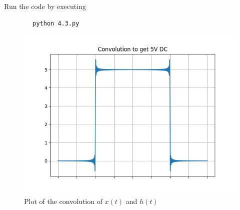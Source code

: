 \documentclass[journal,12pt,twocolumn]{IEEEtran}
\numberwithin{equation}{section}
\numberwithin{figure}{section}
\renewcommand\thesection{\arabic{section}}
\begin{document}
\begin{enumerate}[label=\thesection.\arabic*,ref=\thesection.\theenumi]
	Run the code by executing
	\begin{lstlisting}
		python 4.3.py
	\end{lstlisting}

	\begin{figure}[!ht]
		\centering
		\includegraphics[width=\columnwidth]{./figs/4.3.png}
		\caption{Plot of the convolution of $x(t)$ and $h(t)$}
		\label{fig-4.3}	
	\end{figure}
	\end{enumerate}
	
\end{document}
